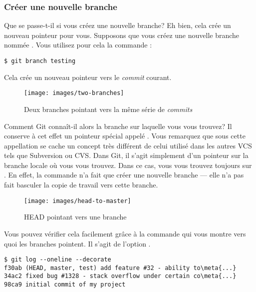 \subsubsection{Créer une nouvelle branche}
\label{sec:git:create_new_branch}

Que se passe-t-il si vous créez une nouvelle branche?
Eh bien, cela crée un nouveau pointeur pour vous.
Supposons que vous créez une nouvelle branche nommée .
Vous utilisez pour cela la commande :
\begin{Schunk}
\begin{Verbatim}
$ git branch testing
\end{Verbatim}
\end{Schunk}

Cela crée un nouveau pointeur vers le \emph{commit} courant.

\begin{figure}[H]
  \centering
  \texttt{[image: images/two-branches]}
  \caption{Deux branches pointant vers la même série de \emph{commits}}
  \label{fig:git:two-branches}
\end{figure}

Comment Git connaît-il alors la branche sur laquelle vous vous trouvez?
Il conserve à cet effet un pointeur spécial appelé .
Vous remarquez que sous cette appellation se cache un concept très différent de celui utilisé dans les autres VCS tels que Subversion ou CVS.
Dans Git, il s'agit simplement d'un pointeur sur la branche locale où vous vous trouvez.
Dans ce cas, vous vous trouvez toujours sur .
En effet, la commande  n'a fait que créer une nouvelle branche — elle n'a pas fait basculer la copie de travail vers cette branche.

\begin{figure}[H]
  \centering
  \texttt{[image: images/head-to-master]}
  \caption{HEAD pointant vers une branche}
  \label{fig:git:head-to-master}
\end{figure}

Vous pouvez vérifier cela facilement grâce à la commande  qui vous montre vers quoi les branches pointent. Il s'agit de l'option .
\begin{Schunk}
\begin{Verbatim}[commandchars=\\\{\}]
$ git log --oneline --decorate
f30ab (HEAD, master, test) add feature #32 - ability to\meta{...}
34ac2 fixed bug #1328 - stack overflow under certain co\meta{...}
98ca9 initial commit of my project
\end{Verbatim}
\end{Schunk}

